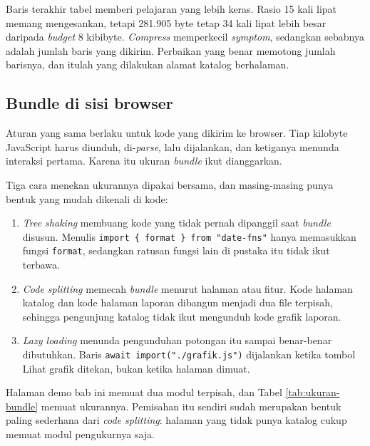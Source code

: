 Baris terakhir tabel memberi pelajaran yang lebih keras. Rasio 15 kali lipat
memang mengesankan, tetapi 281.905 byte tetap 34 kali lipat lebih besar
daripada \textit{budget} 8 kibibyte. \textit{Compress} memperkecil \textit{symptom}, sedangkan
sebabnya adalah jumlah baris yang dikirim. Perbaikan yang benar memotong
jumlah barisnya, dan itulah yang dilakukan alamat katalog berhalaman.

\subsection*{Bundle di sisi browser}

Aturan yang sama berlaku untuk kode yang dikirim ke browser. Tiap kilobyte
JavaScript harus diunduh, di-\textit{parse}, lalu dijalankan, dan ketiganya
menunda interaksi pertama. Karena itu ukuran \textit{bundle} ikut dianggarkan.

Tiga cara menekan ukurannya dipakai bersama, dan masing-masing punya bentuk
yang mudah dikenali di kode:

\begin{enumerate}
  \item \textit{Tree shaking} membuang kode yang tidak pernah dipanggil saat
        \textit{bundle} disusun. Menulis
        \texttt{import \{ format \} from "date-fns"} hanya memasukkan fungsi
        \texttt{format}, sedangkan ratusan fungsi lain di pustaka itu tidak
        ikut terbawa.
  \item \textit{Code splitting} memecah \textit{bundle} menurut halaman atau
        fitur. Kode halaman katalog dan kode halaman laporan dibangun menjadi
        dua file terpisah, sehingga pengunjung katalog tidak ikut mengunduh
        kode grafik laporan.
  \item \textit{Lazy loading} menunda pengunduhan potongan itu sampai
        benar-benar dibutuhkan. Baris
        \texttt{await import("./grafik.js")} dijalankan ketika tombol Lihat
        grafik ditekan, bukan ketika halaman dimuat.
\end{enumerate}

Halaman demo bab ini memuat dua modul terpisah, dan Tabel
\ref{tab:ukuran-bundle} memuat ukurannya. Pemisahan itu sendiri sudah
merupakan bentuk paling sederhana dari \textit{code splitting}: halaman yang
tidak punya katalog cukup memuat modul pengukurnya saja.

